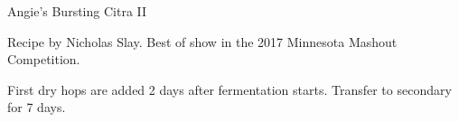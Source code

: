 \begin{recipe}{Angie's Bursting Citra II}

\begin{aboutblock}
Recipe by Nicholas Slay. Best of show in the 2017 Minnesota Mashout Competition.
\end{aboutblock}


\begin{methodandtiming}
 
\begin{mashsteps}
\end{mashsteps}

\begin{fermentationsteps}
\end{fermentationsteps}

\begin{directions}
First dry hops are added 2 days after fermentation starts. Transfer to
secondary for 7 days.
\end{directions}

\end{methodandtiming}

\recipebreak

\begin{ingredientsblock}

\begin{malts}
\end{malts}

\begin{hops}
\end{hops}


\end{ingredientsblock}

\end{recipe}

